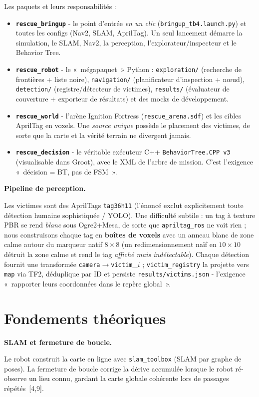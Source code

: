 \documentclass[11pt,a4paper]{article}
\newcommand{\head}[1]{\par\smallskip\noindent\textbf{\color{nccblue}#1}\par}
\begin{document}
\noindent Les paquets et leurs responsabilités :
\begin{itemize}
\item \textbf{\texttt{rescue\_bringup}} - le point d'entrée \emph{en un clic}
(\texttt{bringup\_tb4.launch.py}) et toutes les configs (Nav2, SLAM, AprilTag). Un seul lancement
démarre la simulation, le SLAM, Nav2, la perception, l'explorateur/inspecteur et le Behavior Tree.
\item \textbf{\texttt{rescue\_robot}} - le «~mégapaquet~» Python : \texttt{exploration/}
(recherche de frontières + liste noire), \texttt{navigation/} (planificateur d'inspection + nœud),
\texttt{detection/} (registre/détecteur de victimes), \texttt{results/} (évaluateur de couverture +
exporteur de résultats) et des mocks de développement.
\item \textbf{\texttt{rescue\_world}} - l'arène Ignition Fortress (\texttt{rescue\_arena.sdf}) et les
cibles AprilTag en voxels. Une \emph{source unique} possède le placement des victimes, de sorte que la
carte et la vérité terrain ne divergent jamais.
\item \textbf{\texttt{rescue\_decision}} - le véritable exécuteur C++ \texttt{BehaviorTree.CPP\,v3}
(visualisable dans Groot), avec le XML de l'arbre de mission. C'est l'exigence «~décision = BT, pas de
FSM~».
\end{itemize}

\head{Pipeline de perception.} Les victimes sont des AprilTags \texttt{tag36h11} (l'énoncé exclut
explicitement toute détection humaine sophistiquée / YOLO). Une difficulté subtile : un tag à texture
PBR se rend \emph{blanc} sous Ogre2+Mesa, de sorte que \texttt{apriltag\_ros} ne voit rien ; nous
construisons chaque tag en \textbf{boîtes de voxels} avec un anneau blanc de zone calme autour du
marqueur natif $8{\times}8$ (un redimensionnement naïf en $10{\times}10$ détruit la zone calme et rend
le tag \emph{affiché mais indétectable}). Chaque détection fournit une transformée
\texttt{camera}$\to$\texttt{victim}\_$i$ ; \texttt{victim\_registry} la projette vers \texttt{map} via
TF2, déduplique par ID et persiste \texttt{results/victims.json} - l'exigence «~rapporter leurs
coordonnées dans le repère global~».

\section{Fondements théoriques}\label{sec:concepts}
\head{SLAM et fermeture de boucle.} Le robot construit la carte en ligne avec \texttt{slam\_toolbox}
(SLAM par graphe de poses). La fermeture de boucle corrige la dérive
accumulée lorsque le robot ré-observe un lieu connu, gardant la carte globale cohérente lors de passages
répétés~[4,9].
\end{document}
